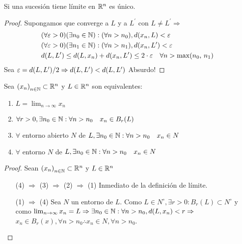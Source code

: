 \begin{lemma}
  Si una sucesión tiene límite en \(\mathbb{R}^n\) es único.
  \begin{proof}
    Supongamos que converge a \(L\) y a \(L^{\prime} \) con \(L \neq L^{\prime} \Rightarrow \) \begin{align*}
       & (\forall \varepsilon > 0)(\exists n_0 \in \mathbb{N}) : (\forall n > n_0), d(x_n, L) < \varepsilon                                      \\
       & (\forall \varepsilon > 0)(\exists n_1 \in \mathbb{N}) : (\forall n > n_1), d(x_n, L^{\prime}) < \varepsilon                             \\
       & d(L, L^{\prime}) \leq d(L, x_n) + d(x_n, L^{\prime}) \leq 2 \cdot \varepsilon \quad \forall n > \max(n_0\text{, } n_1)
    \end{align*}
    Sea \(\varepsilon = d(L, L^{\prime})/2 \Rightarrow d(L, L^{\prime}) < d(L, L^{\prime})\) Absurdo!
  \end{proof}
\end{lemma}

\begin{prop}
  Sea \({(x_n)}_{n \in \mathbb{N}} \subset \mathbb{R}^n\) y \(L \in \mathbb{R}^n\) son equivalentes:

  \begin{enumerate}
    \item \(L = \lim_{n \to \infty} x_n\)
    \item \(\forall r > 0, \exists n_0 \in \mathbb{N} : \forall n > n_0 \quad x_n \in B_r(L)\)
    \item \(\forall \) entorno abierto \(N\) de \(L, \exists n_0 \in \mathbb{N} : \forall n > n_0 \quad x_n \in N\)
    \item \(\forall \) entorno \(N\) de \(L, \exists n_0 \in \mathbb{N} : \forall n > n_0 \quad x_n \in N\)
  \end{enumerate}
  \begin{proof}
    Sean \({(x_n)}_{n \in \mathbb{N}} \subset \mathbb{R}^n\) y \(L \in \mathbb{R}^n\) \begin{enumerate}
      \item[(4) \(\Rightarrow \) (3) \(\Rightarrow \) (2) \(\Rightarrow \) (1)] Inmediato de la definición de límite.
      \item [(1) \(\Rightarrow \) (4)] Sea \(N\) un entorno de \(L\). Como \(L \in N^{\circ}, \exists r > 0 : B_r(L) \subset N^{\circ} \) y como \(\lim_{n \to \infty} x_n = L \Rightarrow \exists n_0 \in \mathbb{N} : \forall n > n_0, d(L, x_n) < r \Rightarrow \) \\
            \(x_n \in B_r(x), \forall n > n_0 \therefore x_n \in N, \forall n > n_0\).
    \end{enumerate}
  \end{proof}
\end{prop}

